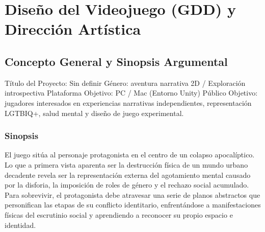 \chapter{Diseño del Videojuego (GDD) y Dirección Artística}

\section{Concepto General y Sinopsis Argumental}
Título del Proyecto: Sin definir
Género: aventura narrativa 2D / Exploración introspectiva
Plataforma Objetivo: PC / Mac (Entorno Unity)
Público Objetivo: jugadores interesados en experiencias narrativas independientes, representación LGTBIQ+, salud mental y diseño de juego experimental.

\subsection{Sinopsis}
El juego sitúa al personaje protagonista en el centro de un colapso apocalíptico. Lo que a primera vista aparenta ser la destrucción física de un mundo urbano decadente revela ser la representación externa del agotamiento mental causado por la disforia, la imposición de roles de género y el rechazo social acumulado. Para sobrevivir, el protagonista debe atravesar una serie de planos abstractos que personifican las etapas de su conflicto identitario, enfrentándose a manifestaciones físicas del escrutinio social y aprendiendo a reconocer su propio espacio e identidad.

